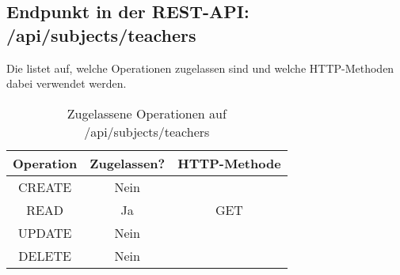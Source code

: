 \subsection{Endpunkt in der REST-API: /api/subjects/teachers}
Die  listet auf, welche Operationen zugelassen sind und welche HTTP-Methoden dabei verwendet werden. 

\begin{table}[!htbp]
	\begin{tabular}{|c|c|c|}
		\hline
			\textbf{Operation} & \textbf{Zugelassen?} & \textbf{HTTP-Methode} \\ \hline
			CREATE & Nein & \\ \hline 
			READ & Ja & GET \\ \hline
			UPDATE & Nein & \\ \hline 
			DELETE & Nein & \\ \hline
	\end{tabular}

		\caption{Zugelassene Operationen auf /api/subjects/teachers}
		\label{tab:end:rest:api:subjects:teachers:meth}
\end{table}

